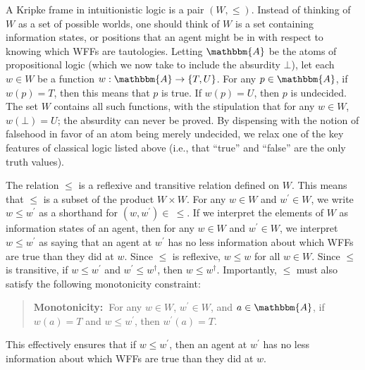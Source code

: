 \documentclass[11pt]{article}
\theoremstyle{definition}
\theoremstyle{remark}
\begin{document}
A Kripke frame in intuitionistic logic is a pair $(W,\leq)$. Instead of thinking of $W$ as a set of possible worlds, one should think of $W$ is a set containing information states, or positions that an agent might be in with respect to knowing which WFFs are tautologies. Letting $\mathbbm{A}$ be the atoms of propositional logic (which we now take to include the absurdity $\bot$), let each $w\in W$ be a function $w:\mathbbm{A}\rightarrow\{T,U\}$. For any $p\in\mathbbm{A}$, if $w(p)=T$, then this means that $p$ is true. If $w(p)=U$, then $p$ is undecided. The set $W$ contains all such functions, with the stipulation that for any $w\in W$, $w(\bot)=U$; the absurdity can never be proved. By dispensing with the notion of falsehood in favor of an atom being merely undecided, we relax one of the key features of classical logic listed above (i.e., that ``true'' and ``false'' are the only truth values).\par  


The relation $\leq$ is a reflexive and transitive relation defined on $W$. This means that $\leq$ is a subset of the product $W\times W$. For any $w\in W$ and $w^{\prime}\in W$, we write $w\leq w^{\prime}$ as a shorthand for $(w,w^{\prime})\in \ \leq$. If we interpret the elements of $W$ as information states of an agent, then for any $w\in W$ and $w^{\prime}\in W$, we interpret $w\leq w^{\prime}$ as saying that an agent at $w^{\prime}$ has no less information about which WFFs are true than they did at $w$. Since $\leq$ is reflexive, $w\leq w$ for all $w\in W$. Since $\leq$ is transitive, if $w\leq w^{\prime}$ and $w^{\prime}\leq w^{\dagger}$, then $w\leq w^{\dagger}$. Importantly, $\leq$ must also satisfy the following monotonicity constraint:
\begin{quote}
    \textbf{Monotonicity:\ }For any $w\in W$, $w^{\prime}\in W$, and $a\in\mathbbm{A}$, if $w(a)=T$ and $w\leq w^{\prime}$, then $w^{\prime}(a)=T$.
\end{quote}
This effectively ensures that if $w\leq w^{\prime}$, then an agent at $w^{\prime}$ has no less information about which WFFs are true than they did at $w$.\par 
\end{document}
